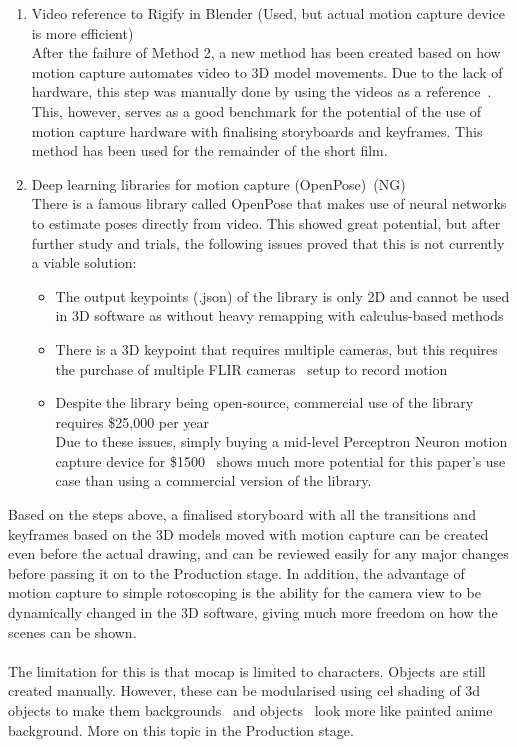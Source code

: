 \begin{enumerate}
    \item Video reference to Rigify in Blender (Used, but actual motion capture device is more efficient)\\
        After the failure of Method 2, a new method has been created based on how motion capture automates video to 3D model movements. Due to the lack of hardware, this step was manually done by using the videos as a reference~\cite{videoToRigRef}. This, however, serves as a good benchmark for the potential of the use of motion capture hardware with finalising storyboards and keyframes. This method has been used for the remainder of the short film.

    \item Deep learning libraries for motion capture (OpenPose)~\cite{openposeArxiv}(NG)\\
    There is a famous library called OpenPose that makes use of neural networks to estimate poses directly from video. This showed great potential, but after further study and trials, the following issues proved that this is not currently a viable solution:
        \begin{itemize}
            \item The output keypoints (.json) of the library is only 2D and cannot be used in 3D software as without heavy remapping with calculus-based methods
            \item There is a 3D keypoint that requires multiple cameras, but this requires the purchase of multiple FLIR cameras~\cite{flirCamera} setup to record motion
            \item Despite the library being open-source, commercial use of the library requires \$25,000 per year~\cite{openPoseCommercial}\\
            Due to these issues, simply buying a mid-level Perceptron Neuron motion capture device for \$1500~\cite{perceptionNeuron} shows much more potential for this paper's use case than using a commercial version of the library.
        \end{itemize}
\end{enumerate}

Based on the steps above, a finalised storyboard with all the transitions and keyframes based on the 3D models moved with motion capture can be created even before the actual drawing, and can be reviewed easily for any major changes before passing it on to the Production stage. In addition, the advantage of motion capture to simple rotoscoping is the ability for the camera view to be dynamically changed in the 3D software, giving much more freedom on how the scenes can be shown.\\\\
The limitation for this is that mocap is limited to characters. Objects are still created manually. However, these can be modularised using cel shading of 3d objects to make them backgrounds~\cite{mclelunBg} and objects~\cite{mclelun3d} look more like painted anime background. More on this topic in the Production stage.

